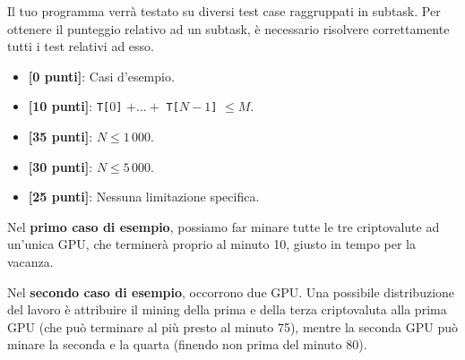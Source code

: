 Il tuo programma verrà testato su diversi test case raggruppati in subtask.
Per ottenere il punteggio relativo ad un subtask, è necessario risolvere correttamente tutti i test relativi ad esso.

\begin{itemize}[nolistsep,itemsep=2mm]
  \item \textbf{ [\phantom{0}0 punti]}: Casi d'esempio.
  \item \textbf{ [10 punti]}: \texttt{T[$0$]} $+ \ldots +$ \texttt{T[$N-1$]} $ \le M$.
  \item \textbf{ [35 punti]}: $N \le 1\,000$.
  \item \textbf{ [30 punti]}: $N \le 5\,000$.
  \item \textbf{ [25 punti]}: Nessuna limitazione specifica.
\end{itemize}



\Examples

\begin{example}
%
%
\end{example}


\Explanation

Nel \textbf{primo caso di esempio}, possiamo far minare tutte le tre criptovalute ad un'unica GPU, che terminerà proprio al minuto 10, giusto in tempo per la vacanza.

Nel \textbf{secondo caso di esempio}, occorrono due GPU. Una possibile distribuzione del lavoro è attribuire il mining della prima e della terza criptovaluta alla prima GPU (che può terminare al più presto al minuto 75), mentre la seconda GPU può minare la seconda e la quarta (finendo non prima del minuto 80).  
